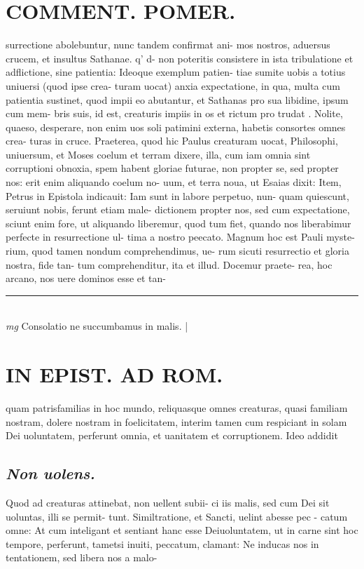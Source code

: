 \documentclass{article}
\begin{document}
\begin{pages}
\section*{COMMENT. POMER.  }\pstart surrectione abolebuntur, nunc tandem confirmat ani- mos nostros, aduersus crucem, et insultus Sathanae.  q' d- non poteritis consistere in ista tribulatione et adflictione, sine patientia: Ideoque exemplum patien- tiae sumite uobis a totius uniuersi (quod ipse crea- turam uocat) anxia expectatione, in qua, multa cum patientia sustinet, quod impii eo abutantur, et Sathanas pro sua libidine, ipsum cum mem- bris suis, id est, creaturis impiis in os et rictum pro trudat . Nolite, quaeso, desperare, non enim uos soli patimini externa, habetis consortes omnes crea- turas in cruce. Praeterea, quod hic Paulus creaturam uocat, Philosophi, uniuersum, et Moses coelum et terram dixere, illa, cum iam omnia sint corruptioni obnoxia, spem habent gloriae futurae, non propter se, sed propter nos: erit enim aliquando coelum no- uum, et terra noua, ut Esaias dixit: Item, Petrus in Epistola indicauit: Iam sunt in labore perpetuo, nun- quam quiescunt, seruiunt nobis, ferunt etiam male- dictionem propter nos, sed cum expectatione, sciunt enim fore, ut aliquando liberemur, quod tum fiet, quando nos liberabimur perfecte in resurrectione ul- tima a nostro peecato. Magnum hoc est Pauli myste- rium, quod tamen nondum comprehendimus, ue- rum sicuti resurrectio et gloria nostra, fide tan- tum comprehenditur, ita et illud. Docemur praete- rea, hoc arcano, nos uere dominos esse et tan-  \pend
\vspace{0.5cm}\noindent
\vspace{0.2cm}\rule{1cm}{0.2pt}\\ 
\hspace{0.2cm}\textit{mg}
\footnotesize Consolatio ne succumbamus in malis. 
\normalsize| 
\section*{IN EPIST. AD ROM.  }
\marginpar{[ p.94 ]}\pstart quam patrisfamilias in hoc mundo, reliquasque omnes creaturas, quasi familiam nostram, dolere nostram in foelicitatem, interim tamen cum respiciant in solam Dei uoluntatem, perferunt omnia, et uanitatem et corruptionem. Ideo addidit  \pend
{}
{}
\subsection*{\textit{Non uolens. }}\pstart Quod ad creaturas attinebat, non uellent subii- ci iis malis, sed cum Dei sit uoluntas, illi se permit- tunt. Similtratione, et Sancti, uelint abesse pec - catum omne: At cum inteligant et sentiant hanc esse Deiuoluntatem, ut in carne sint hoc tempore, perferunt, tametsi inuiti, peccatum, clamant: Ne inducas nos in tentationem, sed libera nos a malo-  \pend
{}
{}

\end{pages}
\end{document}

